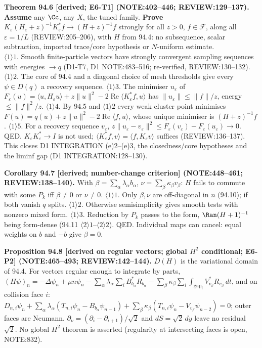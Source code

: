 \textbf{Theorem 94.6 [derived; E6-T1] (NOTE:402--446; REVIEW:129--137).}  \textbf{Assume} any \(\Cc\), any \(X\), the tuned
family.  \textbf{Prove} \(K_\varepsilon(H_\varepsilon+z)^{-1}K_\varepsilon^*f\to(H+z)^{-1}f\) strongly for all \(z>0\), \(f\in\mathcal F\), along all
\(\varepsilon=1/L\) (REVIEW:205--206), with \(H\) from 94.4: no subsequence, scalar subtraction, imported trace/core hypothesis
or \(N\)-uniform estimate.\\
\(\langle1\rangle1\). Smooth finite-particle vectors have strongly convergent sampling sequences with energies \(\to q\) (D1-T7,
D1 NOTE:483--516; re-verified, REVIEW:130--132).  \(\langle1\rangle2\). The core of 94.4 and a diagonal choice of mesh thresholds
give every \(\psi\in D(q)\) a recovery sequence.  \(\langle1\rangle3\). The minimiser \(u_\varepsilon\) of
\(F_\varepsilon(u)=\langle u,H_\varepsilon u\rangle+z\|u\|^2-2\operatorname{Re}\langle K_\varepsilon^*f,u\rangle\) has \(\|u_\varepsilon\|\le\|f\|/z\), energy
\(\le\|f\|^2/z\).  \(\langle1\rangle4\). By 94.5 and \(\langle1\rangle2\) every weak cluster point minimises
\(F(u)=q(u)+z\|u\|^2-2\operatorname{Re}\langle f,u\rangle\), whose unique minimiser is \((H+z)^{-1}f\).  \(\langle1\rangle5\). For a
recovery sequence \(v_\varepsilon\), \(z\|u_\varepsilon-v_\varepsilon\|^2\le F_\varepsilon(v_\varepsilon)-F_\varepsilon(u_\varepsilon)\to0\).  QED.
\(K_\varepsilon K_\varepsilon^*\to I\) is not used; \(\langle K_\varepsilon^*f,v\rangle=\langle f,K_\varepsilon v\rangle\) suffices (REVIEW:136--137).  This closes
D1 INTEGRATION (e)2--(e)3, the closedness/core hypotheses and the liminf gap (D1 INTEGRATION:128--130).

\textbf{Corollary 94.7 [derived; number-change criterion] (NOTE:448--461; REVIEW:138--140).}  With
\(\beta=\sum_\alpha\lambda_\alpha b_\alpha\), \(\nu=\sum_\beta\kappa_\beta v_\beta\): \(H\) fails to commute with some \(P_k\) iff \(\beta\neq0\) or
\(\nu\neq0\).  \(\langle1\rangle1\). Only \(\beta,\nu\) are off-diagonal in \(n\) (94.10); if both vanish \(q\) splits.
\(\langle1\rangle2\). Otherwise semisimplicity gives smooth tests with nonzero mixed form.  \(\langle1\rangle3\). Reduction by \(P_k\)
passes to the form, \(\Ran(H+1)^{-1}\) being form-dense (94.11 \(\langle2\rangle1\)--\(\langle2\rangle2\)).  QED.  Individual maps
can cancel: equal weights on \(b\) and \(-b\) give \(\beta=0\).

\textbf{Proposition 94.8 [derived on regular vectors; global \(H^2\) conditional; E6-P2] (NOTE:465--493; REVIEW:142--144).}
\(D(H)\) is the variational domain of 94.4.  For vectors regular enough to integrate by parts,
\((H\psi)_n=-\Delta\psi_n+\mu n\psi_n-\sum_\alpha\lambda_\alpha\sum_iB_{b_\alpha}^*R_{b_\alpha}-\sum_\beta\kappa_\beta\sum_i\int_{\mathrm{gap}_i}V_{v_\beta}^*R_{v_\beta}\,dt\), and on collision face \(i\):
\(D_{n,i}\psi_n+\sum_\alpha\lambda_\alpha(T_{n,i}\psi_n-B_{b_\alpha}\psi_{n-1})+\sum_\beta\kappa_\beta(T_{n,i}\psi_n-V_{v_\beta}\psi_{n-2})=0\);
outer faces are Neumann.  \(\partial_\nu=(\partial_i-\partial_{i+1})/\sqrt2\) and \(dS=\sqrt2\,dy\) leave no residual \(\sqrt2\).  No global
\(H^2\) theorem is asserted (regularity at intersecting faces is open, NOTE:832).

